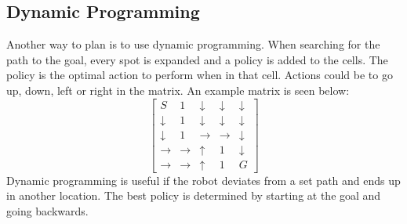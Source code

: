 \subsection{Dynamic Programming}
Another way to plan is to use dynamic programming. When searching for the path to the goal, every spot is expanded and a policy is added to the cells. The policy is the optimal action to perform when in that cell. Actions could be to go up, down, left or right in the matrix. An example matrix is seen below: 
\[
\begin{bmatrix}
S & 1 & \downarrow & \downarrow & \downarrow\\ 
\downarrow & 1 & \downarrow & \downarrow & \downarrow\\ 
\downarrow & 1 & \rightarrow & \rightarrow & \downarrow\\ 
\rightarrow & \rightarrow & \uparrow & 1 & \downarrow\\ 
\rightarrow & \rightarrow & \uparrow & 1 & G
\end{bmatrix}
\]
Dynamic programming is useful if the robot deviates from a set path and ends up in another location. The best policy is determined by starting at the goal and going backwards. 



